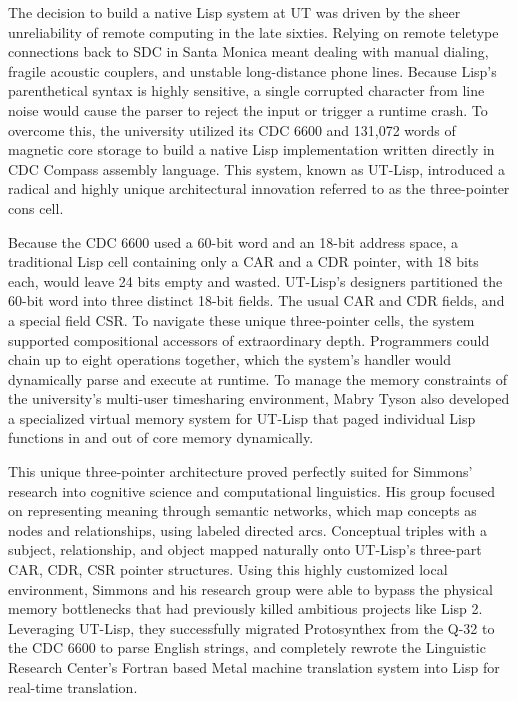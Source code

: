 The decision to build a native Lisp system at UT was driven by the sheer unreliability of remote computing in the late sixties. Relying on remote teletype connections back to SDC in Santa Monica meant dealing with manual dialing, fragile acoustic couplers, and unstable long-distance phone lines. Because Lisp's parenthetical syntax is highly sensitive, a single corrupted character from line noise would cause the parser to reject the input or trigger a runtime crash. To overcome this, the university utilized its CDC 6600 and 131,072 words of magnetic core storage to build a native Lisp implementation written directly in CDC Compass assembly language. This system, known as UT-Lisp, introduced a radical and highly unique architectural innovation referred to as the three-pointer cons cell.

Because the CDC 6600 used a 60-bit word and an 18-bit address space, a traditional Lisp cell containing only a CAR and a CDR pointer, with 18 bits each, would leave 24 bits empty and wasted. UT-Lisp's designers partitioned the 60-bit word into three distinct 18-bit fields. The usual CAR and CDR fields, and a special field CSR. To navigate these unique three-pointer cells, the system supported compositional accessors of extraordinary depth. Programmers could chain up to eight operations together, which the system's handler would dynamically parse and execute at runtime. To manage the memory constraints of the university's multi-user timesharing environment, Mabry Tyson also developed a specialized virtual memory system for UT-Lisp that paged individual Lisp functions in and out of core memory dynamically.

This unique three-pointer architecture proved perfectly suited for Simmons' research into cognitive science and computational linguistics. His group focused on representing meaning through semantic networks, which map concepts as nodes and relationships, using labeled directed arcs. Conceptual triples with a subject, relationship, and object mapped naturally onto UT-Lisp's three-part CAR, CDR, CSR pointer structures. Using this highly customized local environment, Simmons and his research group were able to bypass the physical memory bottlenecks that had previously killed ambitious projects like Lisp 2. Leveraging UT-Lisp, they successfully migrated Protosynthex from the Q-32 to the CDC 6600 to parse English strings, and completely rewrote the Linguistic Research Center’s Fortran based Metal machine translation system into Lisp for real-time translation.

